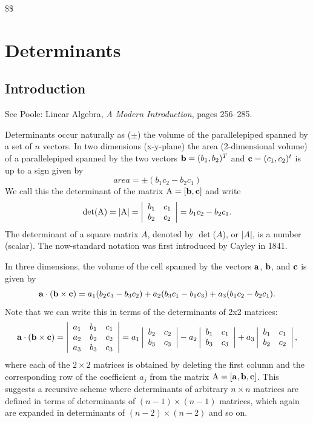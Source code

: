 \documentclass[
  letterpaper,
  DIV=11,
  numbers=noendperiod]{scrartcl}
\theoremstyle{remark}
\begin{document}
\$\$

\section{Determinants}\label{determinants}

\subsection{Introduction}\label{introduction}

See Poole: Linear Algebra, \emph{A Modern Introduction}, pages 256--285.

Determinants occur naturally as (\(\pm\)) the volume of the
parallelepiped spanned by a set of \(n\) vectors. In two dimensions
(x-y-plane) the area (2-dimensional volume) of a parallelepiped spanned
by the two vectors \({\bf b}=(b_{1},b_{2})^{T}\) and
\({\bf c}=(c_{1},c_{2})^{t}\) is up to a sign given by
\[area = \pm(b_{1}c_{2}- b_{2} c_{1} )\] We call this the determinant of
the matrix \({\rm A} = [{\bf b},{\bf c}]\) and write
\[{\rm det(A)}= |{\rm A}|=\left| 
\begin{array}{cc}
b_{1} & c_{1} \\ 
b_{2} & c_{2}
\end{array}
\right| = b_{1}c_{2}- b_{2} c_{1} .\] The determinant of a square matrix
\(A\), denoted by \(\det\)(\(A\)), or \(\left|
A\right|\), is a number (scalar). The now-standard notation was first
introduced by Cayley in 1841.

In three dimensions, the volume of the cell spanned by the vectors
\({\bf a}\), \({\bf b}\), and \({\bf c}\) is given by
\[{\bf a}\cdot ( {\bf b} \times {\bf c} )= a_{1}(b_{2}c_{3}- b_{3}c_{2}) + a_{2} (b_{3}c_{1}-b_{1}c_{3}) + a_{3} (b_{1}c_{2}-b_{2}c_{1}).\]
Note that we can write this in terms of the determinants of 2x2
matrices: \[{\bf a}\cdot ({\bf b} \times {\bf c}) = \left| 
\begin{array}{ccc}
a_{1} & b_{1} & c_{1} \\ 
a_{2} & b_{2} & c_{2} \\ 
a_{3} & b_{3} & c_{3}
\end{array}
\right|  = a_{1} \left| 
\begin{array}{cc}
b_{2} & c_{2} \\ 
b_{3} & c_{3}
\end{array}
\right|  - a_{2} \left| 
\begin{array}{cc}
b_{1} & c_{1} \\ 
b_{3} & c_{3}
\end{array}
\right| + a_{3} \left| 
\begin{array}{cc}
b_{1} & c_{1} \\ 
b_{2} & c_{2}
\end{array}
\right| ,\] where each of the \(2 \times 2\) matrices is obtained by
deleting the first column and the corresponding row of the coefficient
\(a_{j}\) from the matrix \({\rm A} = [{\bf a},{\bf b}, {\bf c}]\). This
suggests a recursive scheme where determinants of arbitrary
\(n \times n\) matrices are defined in terms of determinants of
\((n-1)\times(n-1)\) matrices, which again are expanded in determinants
of \((n-2)\times(n-2)\) and so on.
\end{document}
